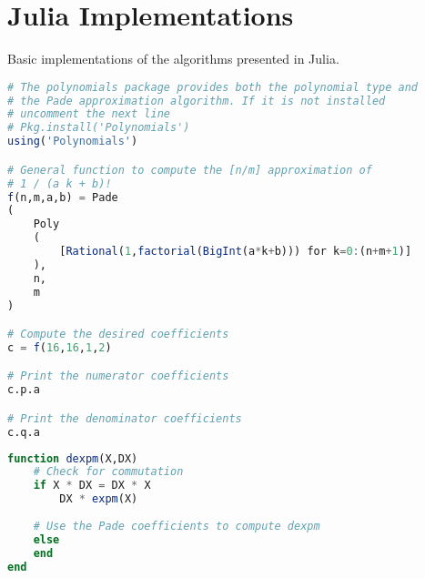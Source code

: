 \chapter{Julia Implementations}
Basic implementations of the algorithms presented in Julia.

\begin{lstlisting}[language=Julia,caption=Poor man's symbolic computation of the Pade coefficients of the generalized hyperbolic functions in Julia]
# The polynomials package provides both the polynomial type and
# the Pade approximation algorithm. If it is not installed 
# uncomment the next line
# Pkg.install('Polynomials')
using('Polynomials')

# General function to compute the [n/m] approximation of
# 1 / (a k + b)!
f(n,m,a,b) = Pade
(
	Poly
	(
		[Rational(1,factorial(BigInt(a*k+b))) for k=0:(n+m+1)]
	),
	n,
	m
)

# Compute the desired coefficients
c = f(16,16,1,2)

# Print the numerator coefficients
c.p.a

# Print the denominator coefficients
c.q.a
\end{lstlisting}

\begin{lstlisting}[language=Julia,caption=An unoptimized implementation of gradient of the matrix exponential in Julia]
function dexpm(X,DX)
	# Check for commutation
	if X * DX = DX * X
		DX * expm(X)
		
	# Use the Pade coefficients to compute dexpm
	else
	end
end
\end{lstlisting}
